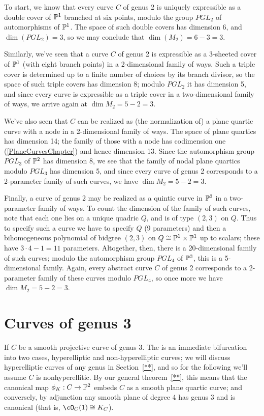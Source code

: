 To start, we know that every curve $C$ of genus 2 is uniquely expressible as a double cover of $\PP^1$ branched at six points, modulo the group $PGL_2$ of automorphisms of $\PP^1$. The space of such double covers has dimension 6, and $\dim(PGL_2) = 3$, so we may conclude that $\dim(M_2) = 6-3 = 3$.

Similarly, we've seen that a curve $C$ of genus 2 is expressible as a 3-sheeted cover of $\PP^1$ (with eight branch points) in a 2-dimensional family of ways. Such a triple cover is determined up to a finite number of choices by its branch divisor, so the space of such triple covers has dimension 8; modulo $PGL_2$ it has dimension 5, and since every curve is expressible as a triple cover in a two-dimensional family of ways, we arrive again at $\dim M_2 = 5-2 = 3$.

We've also seen that $C$ can be realized as (the normalization of) a plane quartic curve with a node in a 2-dimensional family of ways. The space of plane quartics has dimension 14; the family of those with a node has codimension one (\ref{PlaneCurvesChapter}) and hence dimension 13. Since  the automorphism group $PGL_3$ of $\PP^2$ has dimension 8, we see that the family of nodal plane quartics modulo $PGL_3$ has dimension 5, and since every curve of genus 2 corresponds to a 2-parameter family of such curves, we have $\dim M_2 = 5-2=3$.

Finally, a curve of genus 2 may be realized as a quintic curve in $\PP^3$ in a two-parameter family of ways. To count the dimension of the family of such curves, note that each one lies on a unique quadric $Q$, and is of type $(2,3)$ on $Q$. Thus to specify such a curve we have to specify $Q$ (9 parameters) and then a bihomogeneous polynomial of bidgree $(2,3)$ on $Q \cong \PP^1 \times \PP^1$ up to scalars; these have $3\cdot 4 - 1 = 11$ parameters. Altogether, then, there is a 20-dimensional family of such curves; modulo the automorphism group $PGL_4$ of $\PP^3$, this is a 5-dimensional family. Again, every abstract curve $C$ of genus 2 corresponds to a 2-parameter family of these curves modulo $PGL_4$, so once more we have $\dim M_2 = 5 - 2 = 3$.

\section{Curves of genus 3}

If $C$ be a smooth projective curve of genus 3. The is an immediate bifurcation into two cases, hyperelliptic and non-hyperelliptic curves; we will discuss hyperelliptic curves of any genus in Section~\ref{**}, and so for the following we'll assume $C$ is nonhyperellitic. By our general theorem~\ref{**}, this means that the canonical map $\phi_K : C \to \PP^2$ embeds $C$ as a smooth plane quartic curve; and conversely, by adjunction any smooth plane of degree 4 has genus 3 and is canonical (that is, $\cO_C(1) \cong K_C$). 

